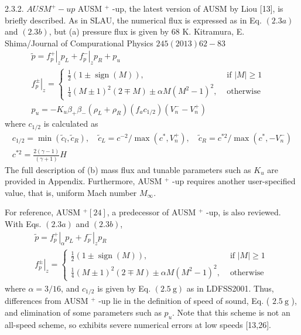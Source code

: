 2.3.2. $A U S M^{+}-u p$
AUSM $^{+}$ -up, the latest version of AUSM by Liou [13], is briefly described. As in SLAU, the numerical flux is expressed as in Eq. $(2.3 a)$ and $(2.3 b)$, but (a) pressure flux is given by
68
K. Kitramura, E. Shima/Journal of Compurational Physics $245(2013) 62-83$
$$
\begin{array}{ll}
\tilde{p}=\left.f_{p}^{+}\right|_{z} p_{L}+\left.f_{p}^{-}\right|_{z} p_{R}+p_{u} & \\
\left.f_{p}^{\pm}\right|_{z}=\left\{\begin{array}{ll}
\frac{1}{2}(1 \pm \operatorname{sign}(M)), & \text{ if }|M| \geqslant 1 \\
\frac{1}{4}(M \pm 1)^{2}(2 \mp M) \pm \alpha M\left(M^{2}-1\right)^{2}, & \text { otherwise }
\end{array}\right. \\
p_{u}=-K_{u} \beta_{+} \beta_{-}\left(\rho_{L}+\rho_{R}\right)\left(f_{a} c_{1 / 2}\right)\left(V_{n}^{-}-V_{n}^{+}\right)
\end{array}
$$
where $c_{1 / 2}$ is calculated as
$$
\begin{array}{l}
c_{1 / 2}=\min \left(\tilde{c}_{l}, \tilde{c}_{R}\right), \quad \tilde{c}_{L}=c^{-2} / \max \left(c^{*}, V_{n}^{+}\right), \quad \tilde{c}_{R}=c^{* 2} / \max \left(c^{*},-V_{n}^{-}\right) \\
c^{* 2}=\frac{2(\gamma-1)}{(\gamma+1)} H
\end{array}
$$
The full description of (b) mass flux and tunable parameters such as $K_{u}$ are provided in Appendix. Furthermore, AUSM $^{+}$ -up requires another user-specified value, that is, uniform Mach number $M_{\infty}$.

For reference, AUSM $^{+}[24]$, a predecessor of AUSM $^{+}$ -up, is also reviewed. With Eqs. $(2.3 a)$ and $(2.3 b)$,
$$
\begin{array}{l}
\tilde{p}=\left.f_{p}^{+}\right|_{\alpha} p_{L}+\left.f_{p}^{-}\right|_{z} p_{R} \\
\left.f_{p}^{\pm}\right|_{z}=\left\{\begin{array}{ll}
\frac{1}{2}(1 \pm \operatorname {sign}(M)), & \text { if }|M| \geqslant 1 \\
\frac{1}{4}(M \pm 1)^{2}(2 \mp M) \pm \alpha M\left(M^{2}-1\right)^{2}, & \text { otherwise }
\end{array}\right.
\end{array}
$$
where $\alpha=3 / 16$, and $c_{1 / 2}$ is given by Eq. $(2.5 \mathrm{~g})$ as in LDFSS2001. Thus, differences from AUSM $^{+}$ -up lie in the definition of speed of sound, Eq. ( $2.5 \mathrm{~g}$ ), and elimination of some parameters such as $p_{u}$. Note that this scheme is not an all-speed scheme, so exhibits severe numerical errors at low speeds [13,26].


